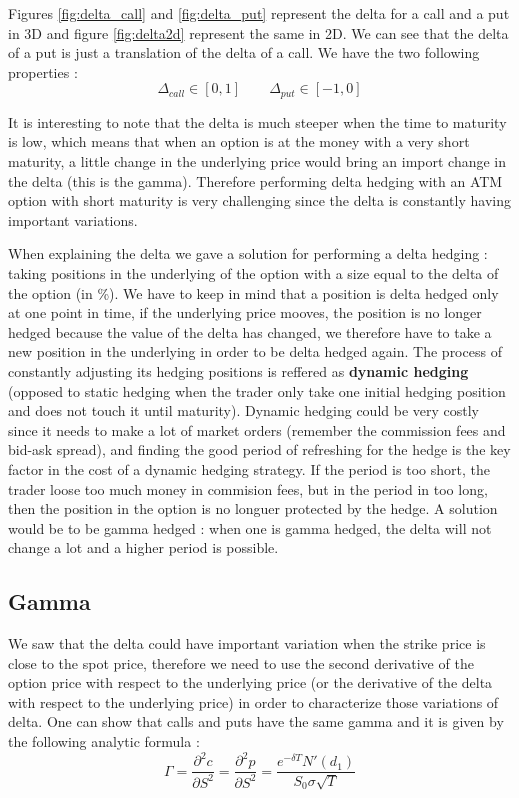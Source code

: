\documentclass[hidelinks]{article}
\begin{document}
Figures \ref{fig:delta_call} and \ref{fig:delta_put} represent the delta for a call and a put in 3D and figure \ref{fig:delta2d} represent the same in 2D. We can see that the delta of a put is just a translation of the delta of a call. We have the two following properties :
$$ \Delta_{call} \in [0,1] \quad \quad \Delta_{put} \in [-1,0]$$

It is interesting to note that the delta is much steeper when the time to maturity is low, which means that when an option is at the money with a very short maturity, a little change in the underlying price would bring an import change in the delta (this is the gamma). Therefore performing delta hedging with an ATM option with short maturity is very challenging since the delta is constantly having important variations.

When explaining the delta we gave a solution for performing a delta hedging : taking positions in the underlying of the option with a size equal to the delta of the option (in \%). We have to keep in mind that a position is delta hedged only at one point in time, if the underlying price mooves, the position is no longer hedged because the value of the delta has changed, we therefore have to take a new position in the underlying in order to be delta hedged again. The process of constantly adjusting its hedging positions is reffered as \textbf{dynamic hedging} (opposed to static hedging when the trader only take one initial hedging position and does not touch it until maturity). Dynamic hedging could be very costly since it needs to make a lot of market orders (remember the commission fees and bid-ask spread), and finding the good period of refreshing for the hedge is the key factor in the cost of a dynamic hedging strategy. If the period is too short, the trader loose too much money in commision fees, but in the period in too long, then the position in the option is no longuer protected by the hedge. A solution would be to be gamma hedged : when one is gamma hedged, the delta will not change a lot and a higher period is possible.
\newpage
\subsection{Gamma}

	We saw that the delta could have important variation when the strike price is close to the spot price, therefore we need to use the second derivative of the option price with respect to the underlying price (or the derivative of the delta with respect to the underlying price) in order to characterize those variations of delta. One can show that calls and puts have the same gamma and it is given by the following analytic formula :
	$$ \Gamma= \frac{\partial^2 c}{\partial S^2} =\frac{\partial^2 p}{\partial S^2} = \frac{ e^{-\delta T}N'(d_1)}{S_0 \sigma \sqrt{T}}$$
	
\end{document}

